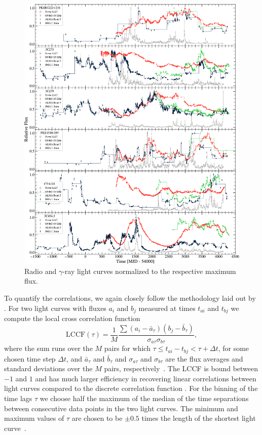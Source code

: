 \documentclass[twocolumn,linenumbers]{aastex62}
\newcommand{\gray}{$\gamma$-ray\xspace}
\begin{document}
\begin{figure}
    \centering
    \includegraphics[width = .8\linewidth]{lc_gamma_radio_tsmin9.pdf}
    \caption{Radio and \gray light curves normalized to the respective maximum flux.}
    \label{fig:lc-radio}
\end{figure}

To quantify the correlations, we again closely follow the methodology laid out by \citet{2014MNRAS.445..437M}. 
For two light curves with fluxes $a_i$ and $b_j$ 
measured at times $t_{ai}$ and $t_{bj}$ we compute the local cross correlation function
\begin{equation}
\mathrm{LCCF}(\tau) = \frac{1}{M}\frac{\sum(a_i - \bar{a}_\tau)(b_j - \bar{b}_\tau)}{\sigma_{a\tau}\sigma_{b\tau}},
\end{equation}
where the sum runs over the $M$ pairs for which $\tau \leqslant t_{ai} - t_{bj} < \tau + \Delta t$, for some chosen time step $\Delta t$, and $\bar{a}_\tau$ and $\bar{b}_\tau$ and $\sigma_{a\tau}$ and $\sigma_{b\tau}$ are the flux averages and standard deviations over the $M$ pairs, respectively~\citep{1999PASP..111.1347W}. 
The LCCF is bound between $-1$ and $1$ and has much larger efficiency in recovering linear correlations between light curves compared to the discrete correlation function \citep{2014MNRAS.445..437M}.
For the binning of the time lags $\tau$ we choose half the maximum of the median of the time separations between consecutive data points in the two light curves.
The minimum and maximum values of $\tau$ are chosen to be $\pm0.5$ times the length of the shortest light curve~\citep{2014MNRAS.445..428M}.
\end{document}
